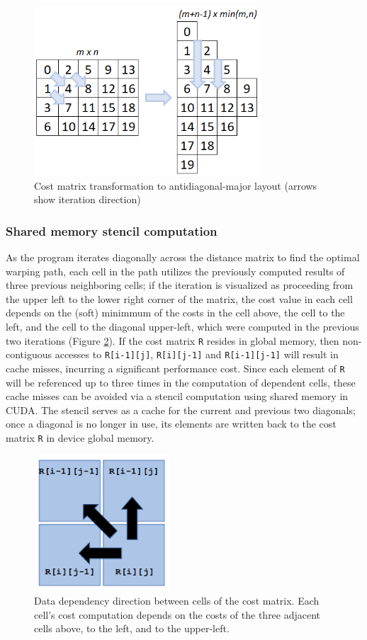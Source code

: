 \documentclass[12pt, letterpaper]{article}
\begin{document}
\begin{figure}[htbp]
  \includegraphics[height=2.5in]{img/diagonal_layout.png}
  \centering
  \caption{Cost matrix transformation to antidiagonal-major layout (arrows show
    iteration direction)}
  \label{diagonal_layout}
  \end{figure}

\subsubsection{Shared memory stencil computation}

As the program iterates diagonally across the distance matrix to find the
optimal warping path, each cell in the path utilizes the previously computed
results of three previous neighboring cells; if the iteration is visualized as
proceeding from the upper left to the lower right corner of the matrix, the cost
value in each cell depends on the (soft) minimmum of the costs in the cell
above, the cell to the left, and the cell to the diagonal upper-left, which were
computed in the previous two iterations (Figure \ref{cost_deps}). If the cost
matrix \verb|R| resides in global memory, then non-contiguous accesses to
\verb|R[i-1][j]|, \verb|R[i][j-1]| and \verb|R[i-1][j-1]| will result in cache
misses, incurring a significant performance cost. Since each element of \verb|R|
will be referenced up to three times in the computation of dependent cells,
these cache misses can be avoided via a stencil computation using shared memory
in CUDA. The stencil serves as a cache for the current and previous two
diagonals; once a diagonal is no longer in use, its elements are written back to
the cost matrix \verb|R| in device global memory.

\begin{figure}[htbp]
\includegraphics[height=2in]{img/cost_dependencies.png}
\centering
\caption{Data dependency direction between cells of the cost matrix.
Each cell's cost computation depends on the costs of the three adjacent cells
above, to the left, and to the upper-left.}
\label{cost_deps}
\end{figure}
\end{document}
